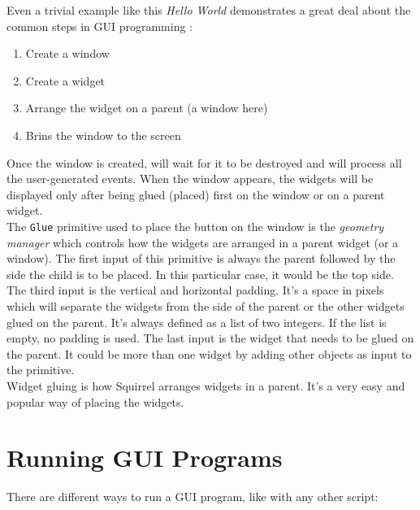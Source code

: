 
Even a trivial example like this {\em Hello World} demonstrates a great deal about the common steps in GUI programming :

\begin{enumerate}
\item Create a window
\item Create a widget
\item Arrange the widget on a parent (a window here)
\item Brins the window to the screen
\end{enumerate}

Once the window is created, \squirrel will wait for it to be destroyed and will process all the user-generated events. When the window appears, the widgets will be displayed only after being glued (placed) first on the window or on a parent widget.\\

The {\tt Glue} primitive used to place the button on the window is the {\em geometry manager} which controls how the widgets are arranged in a parent widget (or a window). The first input of this primitive is always the parent followed by the side the child is to be placed.  In this particular case, it would be the top side. The third input is the vertical and horizontal padding. It's a space in pixels which will separate the widgets from the side of the parent or the other widgets glued on the parent. It's always defined as a list of two integers. If the list is empty, no padding is used. The last input is the widget that needs to be glued on the parent. It could be more than one widget by adding other objects as input to the primitive.\\

Widget gluing is how Squirrel arranges widgets in a parent. It's a very easy and popular way of placing the widgets.\\

\section{Running GUI Programs}

There are different ways to run a \squirrel GUI program, like with any other script:\\

